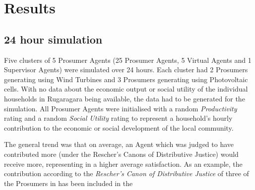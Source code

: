 \chapter{Results}
\label{Results}

\section*{24 hour simulation}
Five clusters of 5 Prosumer Agents (25 Prosumer Agents, 5 Virtual Agents and 1 Supervisor Agents) were simulated over 24 hours. Each cluster had 2 Prosumers generating using Wind Turbines and 3 Prosumers generating using Photovoltaic cells. With no data about the economic output or social utility of the individual households in Rugaragara being available, the data had to be generated for the simulation. All Prosumer Agents were initialised with a random \textit{Productivity} rating and a random \textit{Social Utility} rating to represent a household's hourly contribution to the economic or social development of the local community.

The general trend was that on average, an Agent which was judged to have contributed more (under the Rescher's Canons of Distributive Justice) would receive more, representing in a higher average satisfaction. As an example, the contribution according to the \textit{Rescher's Canon of Distributive Justice} of three of the Prosumers in  has been included in the 



